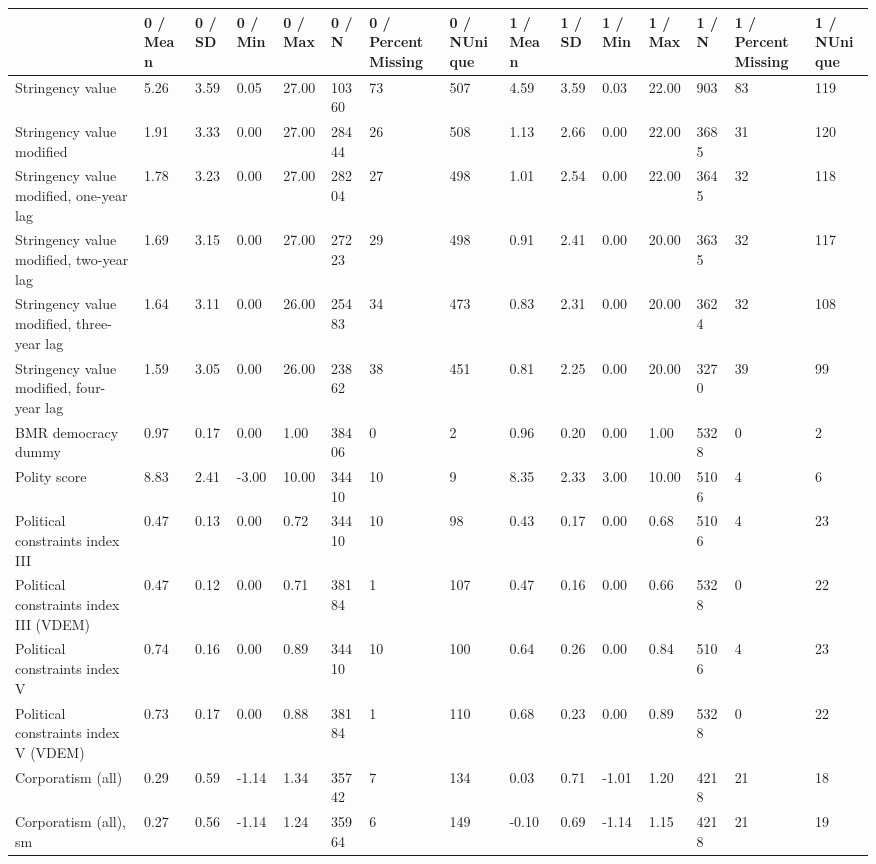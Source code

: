 
\begin{longtable}{lllllllllllllll}
\toprule
  & 0 / Mean & 0 / SD & 0 / Min & 0 / Max & 0 / N & 0 / PercentMissing & 0 / NUnique & 1 / Mean & 1 / SD & 1 / Min & 1 / Max & 1 / N & 1 / PercentMissing & 1 / NUnique\\
\midrule
Stringency value & 5.26 & 3.59 & 0.05 & 27.00 & 10360 & 73 & 507 & 4.59 & 3.59 & 0.03 & 22.00 & 903 & 83 & 119\\
Stringency value modified & 1.91 & 3.33 & 0.00 & 27.00 & 28444 & 26 & 508 & 1.13 & 2.66 & 0.00 & 22.00 & 3685 & 31 & 120\\
Stringency value modified, one-year lag & 1.78 & 3.23 & 0.00 & 27.00 & 28204 & 27 & 498 & 1.01 & 2.54 & 0.00 & 22.00 & 3645 & 32 & 118\\
Stringency value modified, two-year lag & 1.69 & 3.15 & 0.00 & 27.00 & 27223 & 29 & 498 & 0.91 & 2.41 & 0.00 & 20.00 & 3635 & 32 & 117\\
Stringency value modified, three-year lag & 1.64 & 3.11 & 0.00 & 26.00 & 25483 & 34 & 473 & 0.83 & 2.31 & 0.00 & 20.00 & 3624 & 32 & 108\\
\addlinespace
Stringency value modified, four-year lag & 1.59 & 3.05 & 0.00 & 26.00 & 23862 & 38 & 451 & 0.81 & 2.25 & 0.00 & 20.00 & 3270 & 39 & 99\\
BMR democracy dummy & 0.97 & 0.17 & 0.00 & 1.00 & 38406 & 0 & 2 & 0.96 & 0.20 & 0.00 & 1.00 & 5328 & 0 & 2\\
Polity score & 8.83 & 2.41 & -3.00 & 10.00 & 34410 & 10 & 9 & 8.35 & 2.33 & 3.00 & 10.00 & 5106 & 4 & 6\\
Political constraints index III & 0.47 & 0.13 & 0.00 & 0.72 & 34410 & 10 & 98 & 0.43 & 0.17 & 0.00 & 0.68 & 5106 & 4 & 23\\
Political constraints index III (VDEM) & 0.47 & 0.12 & 0.00 & 0.71 & 38184 & 1 & 107 & 0.47 & 0.16 & 0.00 & 0.66 & 5328 & 0 & 22\\
\addlinespace
Political constraints index V & 0.74 & 0.16 & 0.00 & 0.89 & 34410 & 10 & 100 & 0.64 & 0.26 & 0.00 & 0.84 & 5106 & 4 & 23\\
Political constraints index V (VDEM) & 0.73 & 0.17 & 0.00 & 0.88 & 38184 & 1 & 110 & 0.68 & 0.23 & 0.00 & 0.89 & 5328 & 0 & 22\\
Corporatism (all) & 0.29 & 0.59 & -1.14 & 1.34 & 35742 & 7 & 134 & 0.03 & 0.71 & -1.01 & 1.20 & 4218 & 21 & 18\\
Corporatism (all), sm & 0.27 & 0.56 & -1.14 & 1.24 & 35964 & 6 & 149 & -0.10 & 0.69 & -1.14 & 1.15 & 4218 & 21 & 19\\

\end{longtable}
